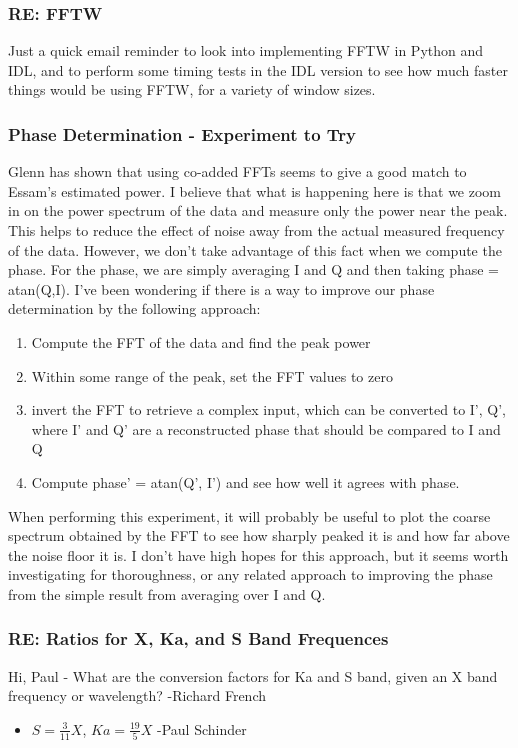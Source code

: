 \documentclass[crop=false,class=book]{standalone}
\begin{document}
\subsubsection{\footnotesize RE: FFTW}
Just a quick email reminder to look into implementing FFTW in Python and IDL, and to perform some timing tests in the IDL version to see how much faster things would be using FFTW, for a variety of window sizes.
\subsubsection{\footnotesize Phase Determination - Experiment to Try}
Glenn has shown that using co-added FFTs seems to give a good match to Essam's estimated power. I believe that what is happening here is that we zoom in on the power spectrum of the data and measure only the power near the peak. This helps to reduce the effect of noise away from the actual measured frequency of the data. However, we don't take advantage of this fact when we compute the phase. For the phase, we are simply averaging I and Q and then taking phase = atan(Q,I). I've been wondering if there is a way to improve our phase determination by the following approach:
\begin{enumerate}
    \item Compute the FFT of the data and find the peak power
    \item Within some range of the peak, set the FFT values to zero
    \item invert the FFT to retrieve a complex input, which can be converted to I', Q', where I' and Q' are a reconstructed phase that should be compared to I and Q
    \item Compute phase' = atan(Q', I') and see how well it agrees with phase.
\end{enumerate}
When performing this experiment, it will probably be useful to plot the coarse spectrum obtained by the FFT to see how sharply peaked it is and how far above the noise floor it is. I don't have high hopes for this approach, but it seems worth investigating for thoroughness, or any related approach to improving the phase from the simple result from averaging over I and Q.
\subsubsection{\footnotesize RE: Ratios for X, Ka, and S Band Frequences}
Hi, Paul - What are the conversion factors for Ka and S band, given an X band frequency or wavelength? -Richard French
\begin{itemize}
    \item $S = \frac{3}{11}X$, $Ka = \frac{19}{5}X$ -Paul Schinder
\end{itemize}
\end{document}

